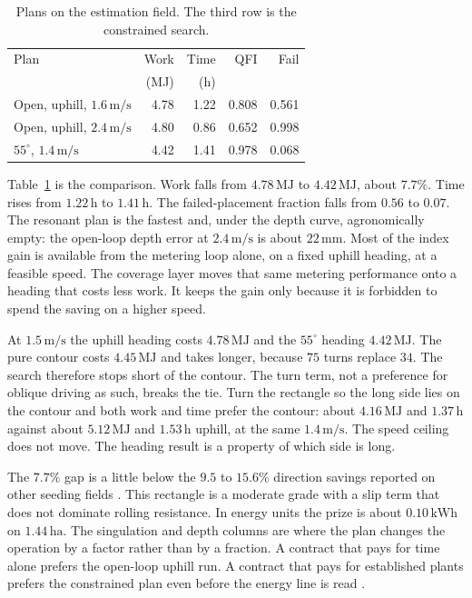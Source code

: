 \documentclass[11pt,a4paper]{article}
\begin{document}
\begin{table}[t]
\centering
\caption{Plans on the estimation field. The third row is the constrained search.}
\label{tab:plans}
\begin{tabular}{@{}lrrrr@{}}
\toprule
Plan & Work & Time & QFI & Fail \\
 & (MJ) & (h) & & \\
\midrule
Open, uphill, \(1.6\,\mathrm{m/s}\) & 4.78 & 1.22 & 0.808 & 0.561 \\
Open, uphill, \(2.4\,\mathrm{m/s}\) & 4.80 & 0.86 & 0.652 & 0.998 \\
\(55^\circ\), \(1.4\,\mathrm{m/s}\) & 4.42 & 1.41 & 0.978 & 0.068 \\
\bottomrule
\end{tabular}
\end{table}

Table~\ref{tab:plans} is the comparison. Work falls from \(4.78\,\mathrm{MJ}\) to \(4.42\,\mathrm{MJ}\), about \(7.7\%\). Time rises from \(1.22\,\mathrm{h}\) to \(1.41\,\mathrm{h}\). The failed-placement fraction falls from \(0.56\) to \(0.07\). The resonant plan is the fastest and, under the depth curve, agronomically empty: the open-loop depth error at \(2.4\,\mathrm{m/s}\) is about \(22\,\mathrm{mm}\). Most of the index gain is available from the metering loop alone, on a fixed uphill heading, at a feasible speed. The coverage layer moves that same metering performance onto a heading that costs less work. It keeps the gain only because it is forbidden to spend the saving on a higher speed.

At \(1.5\,\mathrm{m/s}\) the uphill heading costs \(4.78\,\mathrm{MJ}\) and the \(55^\circ\) heading \(4.42\,\mathrm{MJ}\). The pure contour costs \(4.45\,\mathrm{MJ}\) and takes longer, because \(75\) turns replace \(34\). The search therefore stops short of the contour. The turn term, not a preference for oblique driving as such, breaks the tie. Turn the rectangle so the long side lies on the contour and both work and time prefer the contour: about \(4.16\,\mathrm{MJ}\) and \(1.37\,\mathrm{h}\) against about \(5.12\,\mathrm{MJ}\) and \(1.53\,\mathrm{h}\) uphill, at the same \(1.4\,\mathrm{m/s}\). The speed ceiling does not move. The heading result is a property of which side is long.

The \(7.7\%\) gap is a little below the \(9.5\) to \(15.6\%\) direction savings reported on other seeding fields \cite{vahdanjoo2023}. This rectangle is a moderate grade with a slip term that does not dominate rolling resistance. In energy units the prize is about \(0.10\,\mathrm{kWh}\) on \(1.44\,\mathrm{ha}\). The singulation and depth columns are where the plan changes the operation by a factor rather than by a fraction. A contract that pays for time alone prefers the open-loop uphill run. A contract that pays for established plants prefers the constrained plan even before the energy line is read \cite{pedersen2006}.
\end{document}

